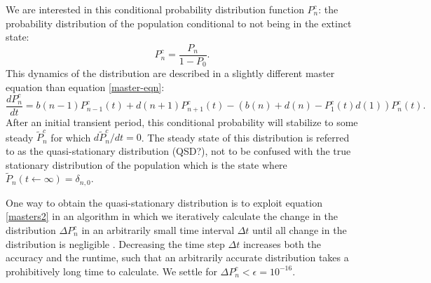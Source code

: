 \documentclass[a4paper,10pt]{article}
\numberwithin{equation}{section} %
\begin{document}
We are interested in this conditional probability distribution function $P_n^c$: the probability distribution of the population conditional to not being in the extinct state: %
\begin{equation*}
 P_n^c = \frac{P_n}{1-P_0}.
\end{equation*}
This dynamics of the distribution are described in a slightly different master equation than equation \ref{master-eqn}:
\begin{equation}
\frac{dP_n^c}{dt} =  b(n-1)P_{n-1}^c(t) + d(n+1)P_{n+1}^c(t) - (b(n) + d(n) - P_1^c(t)d(1))P_n^c(t). 
\label{masters2}
\end{equation}
After an initial transient period, this conditional probability will stabilize to some steady $\tilde{P}^c_n$ for which $d\tilde{P}_n^c/dt=0$. 
The steady state of this distribution is referred to as the quasi-stationary distribution (QSD?), not to be confused with the true stationary distribution of the population which is the state where $\tilde{P}_n(t\leftarrow\infty)=\delta_{n,0}$. 

One way to obtain the quasi-stationary distribution is to exploit equation \ref{masters2} in an algorithm in which we iteratively calculate the change in the distribution $\Delta P^c_n$ in an arbitrarily small time interval $\Delta t$ until all change in the distribution is negligible \cite{Nisbet1982}.
Decreasing the time step $\Delta t$ increases both the accuracy and the runtime, such that an arbitrarily accurate distribution takes a prohibitively long time to calculate. 
We settle for $\Delta P^c_n<\epsilon = 10^{-16}$. %
\end{document}
